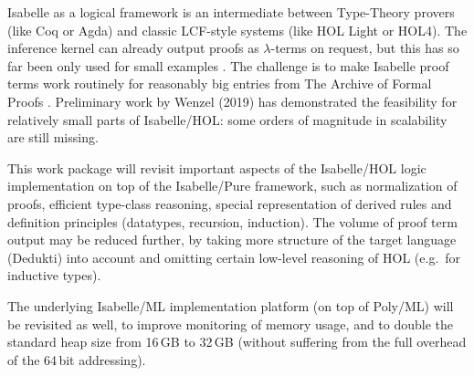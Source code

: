 

Isabelle as a logical framework \cite{paulson700} is an intermediate
between Type-Theory provers (like Coq or Agda) and classic LCF-style
systems (like HOL Light or HOL4). The inference kernel can already
output proofs as $\lambda$-terms on request, but this has so far been
only used for small examples \cite{Berghofer-Nipkow:2000:TPHOL}. The
challenge is to make Isabelle proof terms work routinely for
reasonably big entries from The Archive of Formal Proofs
\cite{isabelle-afp}. Preliminary work by Wenzel (2019) has
demonstrated the feasibility for relatively small parts of
Isabelle/HOL: some orders of magnitude in scalability are still
missing.

This work package will revisit important aspects of the Isabelle/HOL
logic implementation on top of the Isabelle/Pure framework, such as
normalization of proofs, efficient type-class reasoning, special
representation of derived rules and definition principles (datatypes,
recursion, induction). The volume of proof term output may be reduced
further, by taking more structure of the target language (Dedukti)
into account and omitting certain low-level reasoning of HOL (e.g.\
for inductive types).


The underlying Isabelle/ML implementation platform (on top of Poly/ML)
will be revisited as well, to improve monitoring of memory usage, and
to double the standard heap size from 16\,GB to 32\,GB (without
suffering from the full overhead of the 64\,bit
addressing).

